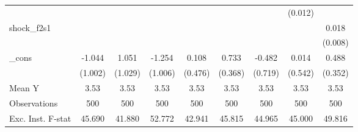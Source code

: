 {\begin{tabular}{l*{8}{c}}
            &                     &                     &                     &                     &                     &                     &     (0.012)         &                     \\
\addlinespace
shock\_f2s1  &                     &                     &                     &                     &                     &                     &                     &       0.018\sym{**} \\
            &                     &                     &                     &                     &                     &                     &                     &     (0.008)         \\
\addlinespace
\_cons      &      -1.044         &       1.051         &      -1.254         &       0.108         &       0.733\sym{*}  &      -0.482         &       0.014         &       0.488         \\
            &     (1.002)         &     (1.029)         &     (1.006)         &     (0.476)         &     (0.368)         &     (0.719)         &     (0.542)         &     (0.352)         \\
\midrule
Mean Y      &        3.53         &        3.53         &        3.53         &        3.53         &        3.53         &        3.53         &        3.53         &        3.53         \\
Observations&         500         &         500         &         500         &         500         &         500         &         500         &         500         &         500         \\
Exc. Inst. F-stat&      45.690         &      41.880         &      52.772         &      42.941         &      45.815         &      44.965         &      45.000         &      49.816         \\
\bottomrule
\end{tabular}
}
